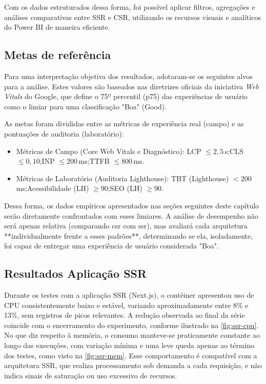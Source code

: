 {Com os dados estruturados dessa forma, foi possível aplicar filtros, agregações e análises comparativas entre SSR e CSR, utilizando os recursos visuais e analíticos do Power BI de maneira eficiente.

\subsection{Metas de referência}
\label{subsec:metas_referencia}

Para uma interpretação objetiva dos resultados, adotaram-se os seguintes alvos para a análise. Estes valores são baseados nas diretrizes oficiais da iniciativa \textit{Web Vitals} do Google, que define o 75º percentil (p75) das experiências de usuário como o limiar para uma classificação "Boa" (Good).

As metas foram divididas entre as métricas de experiência real (campo) e as pontuações de auditoria (laboratório):

\begin{itemize}
    \item Métricas de Campo (Core Web Vitals e Diagnóstico): 
    LCP $\leq 2{,}5$\,s;\quad CLS $\leq 0{,}10$;\quad INP $\leq 200$\,ms;\quad TTFB $\leq 800$\,ms.
    
    \item Métricas de Laboratório (Auditoria Lighthouse): 
    TBT (Lighthouse) $<200$\,ms;\quad Acessibilidade (LH) $\geq 90$;\quad SEO (LH) $\geq 90$.
\end{itemize}

Dessa forma, os dados empíricos apresentados nas seções seguintes deste capítulo serão diretamente confrontados com esses limiares. A análise de desempenho não será apenas relativa (comparando \acrshort{csr} com \acrshort{ssr}), mas avaliará cada arquitetura **individualmente frente a esses padrões**, determinando se ela, isoladamente, foi capaz de entregar uma experiência de usuário considerada "Boa".

\subsection{Resultados Aplicação SSR}
\label{subsec:resultados-ssr}

Durante os testes com a aplicação SSR (Next.js), o contêiner apresentou uso de CPU consistentemente baixo e estável, variando aproximadamente entre 8\% e 13\%, sem registros de picos relevantes. A redução observada ao final da série coincide com o encerramento do experimento, conforme ilustrado na \autoref{fig:ssr-cpu}. No que diz respeito à memória, o consumo manteve-se praticamente constante ao longo das execuções, com variação mínima e uma leve queda apenas ao término dos testes, como visto na \autoref{fig:ssr-mem}. Esse comportamento é compatível com a arquitetura SSR, que realiza processamento sob demanda a cada requisição, e não indica sinais de saturação ou uso excessivo de recursos.

}
